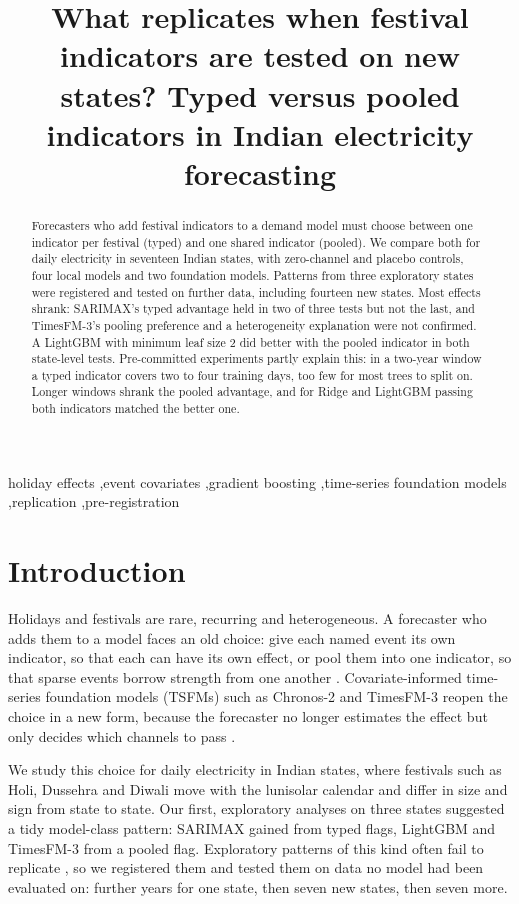 \documentclass[review,12pt,authoryear]{elsarticle}
\begin{document}
\begin{frontmatter}
\title{What replicates when festival indicators are tested on new states? Typed versus pooled indicators in Indian electricity forecasting}
\begin{abstract}
Forecasters who add festival indicators to a demand model must choose between one indicator per festival (typed) and one shared indicator (pooled). We compare both for daily electricity in seventeen Indian states, with zero-channel and placebo controls, four local models and two foundation models. Patterns from three exploratory states were registered and tested on further data, including fourteen new states. Most effects shrank: SARIMAX's typed advantage held in two of three tests but not the last, and TimesFM-3's pooling preference and a heterogeneity explanation were not confirmed. A LightGBM with minimum leaf size 2 did better with the pooled indicator in both state-level tests. Pre-committed experiments partly explain this: in a two-year window a typed indicator covers two to four training days, too few for most trees to split on. Longer windows shrank the pooled advantage, and for Ridge and LightGBM passing both indicators matched the better one.
\end{abstract}
\begin{keyword}
holiday effects \sep event covariates \sep gradient boosting \sep time-series foundation models \sep replication \sep pre-registration
\end{keyword}
\end{frontmatter}
\linenumbers
\section{Introduction}

Holidays and festivals are rare, recurring and heterogeneous. A forecaster who adds them to a model faces an old choice: give each named event its own indicator, so that each can have its own effect, or pool them into one indicator, so that sparse events borrow strength from one another \citep{ziel2018,arora2018b}. Covariate-informed time-series foundation models (TSFMs) such as Chronos-2 \citep{ansari2025b} and TimesFM-3 \citep{jain2026} reopen the choice in a new form, because the forecaster no longer estimates the effect but only decides which channels to pass \citep{kreusel2026,alipour2025}.

We study this choice for daily electricity in Indian states, where festivals such as Holi, Dussehra and Diwali move with the lunisolar calendar and differ in size and sign from state to state. Our first, exploratory analyses on three states suggested a tidy model-class pattern: SARIMAX gained from typed flags, LightGBM and TimesFM-3 from a pooled flag. Exploratory patterns of this kind often fail to replicate \citep{boylan2015}, so we registered them and tested them on data no model had been evaluated on: further years for one state, then seven new states, then seven more.
\end{document}
